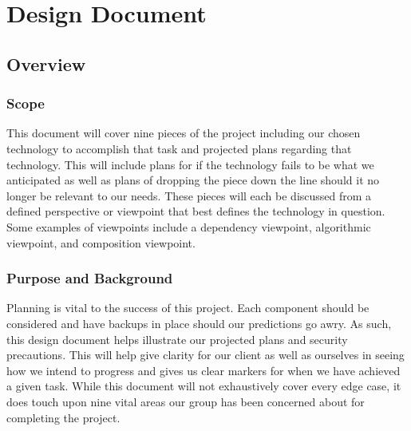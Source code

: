 \documentclass[article, onecolumn, draftclsnofoot,10pt, compsoc]{IEEEtran}
\begin{document}
\section{Design Document}

\subsection{Overview}

\subsubsection{Scope}
This document will cover nine pieces of the project including our chosen technology to accomplish that task and projected plans regarding that technology. This will include plans for if the technology fails to be what we anticipated as well as plans of dropping the piece down the line should it no longer be relevant to our needs. These pieces will each be discussed from a defined perspective or viewpoint that best defines the technology in question. Some examples of viewpoints include a dependency viewpoint, algorithmic viewpoint, and composition viewpoint.

\subsubsection{Purpose and Background}
Planning is vital to the success of this project. Each component should be considered and have backups in place should our predictions go awry. As such, this design document helps illustrate our projected plans and security precautions. This will help give clarity for our client as well as ourselves in seeing how we intend to progress and gives us clear markers for when we have achieved a given task. While this document will not exhaustively cover every edge case, it does touch upon nine vital areas our group has been concerned about for completing the project. 
\end{document}
